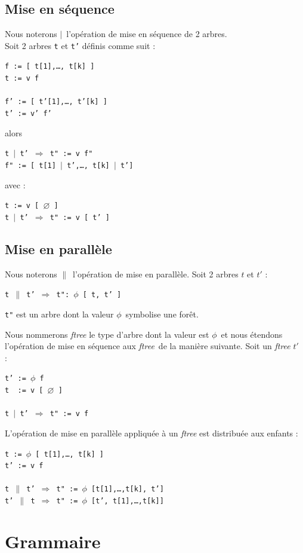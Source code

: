 \documentclass{article}
\newcommand{\op}	[1]		{\vspace{0mm}\begin{center}\colorbox{mygrey}{
							\begin{minipage}[t]{0.9\columnwidth} 
							{\small \texttt{#1}}
							\end{minipage}}\end{center}}
\newcommand{\nulltree}	{\ensuremath{\varnothing}}
\newcommand{\seq}		{\ensuremath{|}}
\newcommand{\paral}		{\ensuremath{\parallel}}
\newcommand{\foret}		{\ensuremath{\phi}}
\newcommand{\ftree}		{ftree}
\newcommand{\etc}		{…}
\begin{document}
\subsection{Mise en séquence}
Nous noterons \seq\ l'opération de mise en séquence de 2 arbres. \\
Soit 2 arbres \texttt{t} et \texttt{t'} définis comme suit :
\op{f := [ t[1],\etc, t[k] ] \\
t :=  v f \\
\\
f' := [ t'[1],\etc, t'[k] ] \\
t' :=  v' f'
}
alors
\op{t \seq\ t'  $\Rightarrow$  t" := v f" \\
f" := [ t[1] \seq\ t',\etc, t[k] \seq\ t']
}
avec : 
\op{t :=  v [ \nulltree\ ]\\
t \seq\ t'  $\Rightarrow$  t" := v [ t' ]
}


\subsection{Mise en parallèle}
Nous noterons \paral\ l'opération de mise en parallèle. 
Soit 2 arbres $t$ et $t'$ :
\op{t \paral\ t'  $\Rightarrow$  t": \foret\ [ t, t' ]
}
\texttt{t"} est un arbre dont la valeur \foret\ symbolise une forêt. 

Nous nommerons \emph{\ftree} le type d'arbre dont la valeur est \foret\ et nous étendons l'opération de mise en séquence aux \emph{\ftree}\ de la manière suivante. Soit un \emph{\ftree} $t'$~ :
\op{t' :=  \foret\ f\\
t \ :=  v [ \nulltree\ ]\\
\\
t \seq\ t'  $\Rightarrow$  t" := v f
}

L'opération de mise en parallèle appliquée à un \emph{\ftree} est distribuée aux enfants : 
\op{t :=  \foret\ [ t[1],\etc, t[k] ]\\
t' :=  v f\\
\\
t \paral\ t'  $\Rightarrow$  t" := \foret\ [t[1],\etc,t[k], t']\\
t' \paral\ t  $\Rightarrow$  t" := \foret\ [t', t[1],\etc,t[k]]
}



\section{Grammaire}\label{agram}
\end{document}
